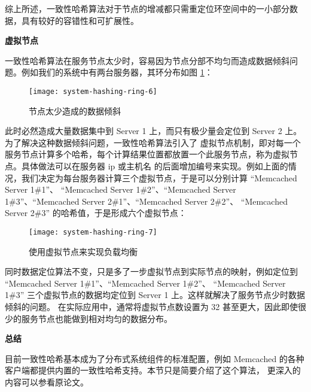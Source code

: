 综上所述，一致性哈希算法对于节点的增减都只需重定位环空间中的一小部分数据，具有较好的容错性和可扩展性。

\noindent\textbf{虚拟节点}

一致性哈希算法在服务节点太少时，容易因为节点分部不均匀而造成数据倾斜问题。例如我们的系统中有两台服务器，其环分布如图%
\ref{fig:system-hashing-ring-6}：

\begin{figure}[hbtp]
\centering
\texttt{[image: system-hashing-ring-6]}
\caption{节点太少造成的数据倾斜}
\label{fig:system-hashing-ring-6}
\end{figure}

此时必然造成大量数据集中到 Server 1 上，而只有极少量会定位到 Server 2 上。为了解决这种数据倾斜问题，一致性哈希算法引入了
虚拟节点机制，即对每一个服务节点计算多个哈希，每个计算结果位置都放置一个此服务节点，称为虚拟节点。具体做法可以在服务器 ip 或主机名
的后面增加编号来实现。例如上面的情况，我们决定为每台服务器计算三个虚拟节点，于是可以分别计算 “Memcached Server 1\#1”、
“Memcached Server 1\#2”、“Memcached Server 1\#3”、“Memcached Server 2\#1”、“Memcached Server 2\#2”、
“Memcached Server 2\#3” 的哈希值，于是形成六个虚拟节点：

\begin{figure}[hbtp]
\centering
\texttt{[image: system-hashing-ring-7]}
\caption{使用虚拟节点来实现负载均衡}
\label{fig:system-hashing-ring-7}
\end{figure}

同时数据定位算法不变，只是多了一步虚拟节点到实际节点的映射，例如定位到 “Memcached Server 1\#1”、“Memcached Server 1\#2”、
“Memcached Server 1\#3” 三个虚拟节点的数据均定位到 Server 1 上。这样就解决了服务节点少时数据倾斜的问题。
在实际应用中，通常将虚拟节点数设置为 32 甚至更大，因此即使很少的服务节点也能做到相对均匀的数据分布。

\noindent\textbf{总结}

目前一致性哈希基本成为了分布式系统组件的标准配置，例如 Memcached 的各种客户端都提供内置的一致性哈希支持。本节只是简要介绍了这个算法，
更深入的内容可以参看原论文。














\endinput
